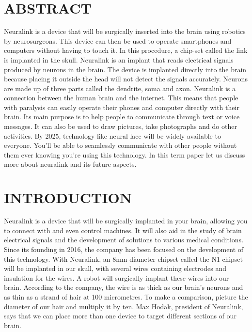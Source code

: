 \documentclass[12pt]{article}
\begin{document}
\tableofcontents
\clearpage

\section*{ABSTRACT}
Neuralink is a device that will be surgically inserted into the brain using robotics by neurosurgeons. This device can then be used to operate smartphones and computers without having to touch it. In this procedure, a chip-set called the link is implanted in the skull. Neuralink is an implant that reads electrical signals produced by neurons in the brain. The device is implanted directly into the brain because placing it outside the head will not detect the signals accurately. Neurons are made up of three parts called the dendrite, soma and axon. Neuralink is a connection between the human brain and the internet. This means that people with paralysis can easily operate their phones and computer directly with their brain. Its main purpose is to help people to communicate through text or voice messages. It can also be used to draw pictures, take photographs and do other activities.
By 2025, technology like neural lace will be widely available to everyone. You'll be able to seamlessly communicate with other people without them ever knowing you're using this technology.
In this term paper let us discuss more about neuralink and its future aspects.
\clearpage

\section{INTRODUCTION}

Neuralink is a device that will be surgically implanted in your brain, allowing you to connect with and even control machines. It will also aid in the study of brain electrical signals and the development of solutions to various medical conditions. Since its founding in 2016, the company has been focused on the development of this technology. 
With Neuralink, an 8mm-diameter chipset called the N1 chipset will be implanted in our skull, with several wires containing electrodes and insulation for the wires. A robot will surgically implant these wires into our brain. According to the company, the wire is as thick as our brain's neurons and as thin as a strand of hair at 100 micrometres. To make a comparison, picture the diameter of our hair and multiply it by ten.
Max Hodak, president of Neuralink, says that we can place more than one device to target different sections of our brain.
\end{document}

